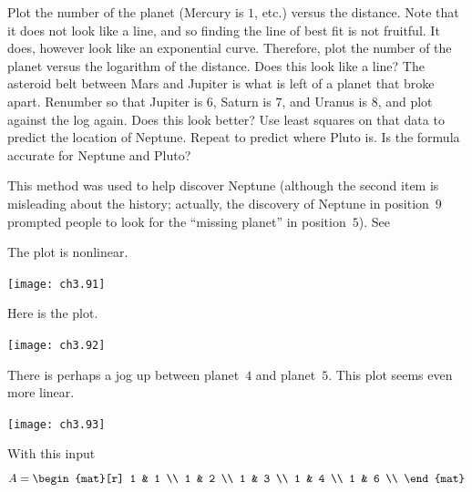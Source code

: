 \begin{exercises}
\begin{exparts}
      \partsitem Plot the number of the planet 
        (Mercury is \( 1 \), etc.) versus the distance.
        Note that it does not look like a line, and so finding the
        line of best fit is not fruitful.
      \partsitem It does, however look like an exponential curve. 
        Therefore, plot the number of the planet versus the
        logarithm of the distance.
        Does this look like a line?
      \partsitem The asteroid belt between Mars and
        Jupiter is 
        what is left of a planet that broke apart.
        Renumber so that Jupiter is $6$, Saturn is $7$, and Uranus is
        $8$, and plot against the log again.
        Does this look better?
      \partsitem Use least squares on that data to predict the 
       location of Neptune.
      \partsitem Repeat to predict where Pluto is.
      \partsitem Is the formula accurate for Neptune and Pluto? 
    \end{exparts}
    This method was used to help discover Neptune (although the second item is
    misleading about the history; actually, the discovery of Neptune 
    in position~$9$ 
    prompted people to look for the ``missing planet'' in position~$5$).
    See \cite{Gardner70}
      \begin{answer}
        \begin{exparts}
          \partsitem The plot is nonlinear.
            \begin{center}  \small
              \texttt{[image: ch3.91]}
            \end{center}
          \partsitem Here is the plot.
           \begin{center}  \small
             \texttt{[image: ch3.92]}
           \end{center}
           There is perhaps a jog up between planet~$4$ and planet~$5$.
          \partsitem This plot seems even more linear.
           \begin{center}  \small
             \texttt{[image: ch3.93]}
           \end{center}
          \partsitem
            With this input
            \begin{equation*}
              A =  
              \begin{mat}[r]
                1 & 1 \\
                1 & 2 \\
                1 & 3 \\
                1 & 4 \\
                1 & 6 \\

\end{mat}
\end{equation*}
\end{exparts}
\end{answer}
\end{exercises}
